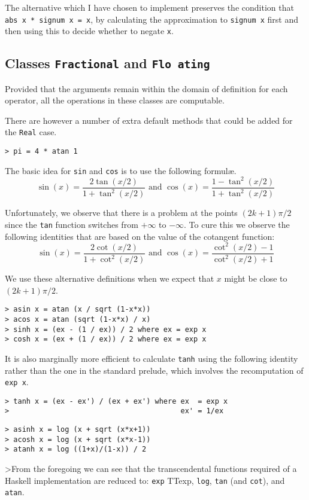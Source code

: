 The alternative which I have chosen to implement preserves the
condition that \mbox{\tt abs\ x\ *\ signum\ x\ =\ x}, by calculating the
approximation to \mbox{\tt signum\ x} first and then using this to decide
whether to negate \mbox{\tt x}.

\subsection{Classes \mbox{\tt Fractional} and \mbox{\tt Flo
ating}}

Provided that the arguments remain within the domain of definition for
each operator, all the operations in these classes are computable.

There are however a number of extra default methods that could be
added for the \mbox{\tt Real} case.
\begin{verbatim}
> pi = 4 * atan 1
\end{verbatim}
The basic idea for \mbox{\tt sin} and \mbox{\tt cos} 
is to use the following formul\ae .
\[\sin(x) = \frac{2 \tan(x/2)}{1+\tan^2(x/2)} \mbox{ and }
  \cos(x) = \frac{1-\tan^2(x/2)}{1+\tan^2(x/2)}\]

Unfortunately, we observe that there is a problem at the points
$(2k+1)\pi / 2$ since the \mbox{\tt tan} function switches from $+
\infty$ to
$-\infty$. To cure this we observe the following identities that are
based on the value of the cotangent function:
\[\sin(x) = \frac{2 \cot(x/2)}{1+\cot^2(x/2)} \mbox{ and }
  \cos(x) = \frac{\cot^2(x/2)-1}{\cot^2(x/2)+1}\]

We use these alternative definitions when we expect that $x$ might be
close to $(2k+1)\pi /2$.
\begin{verbatim}
> asin x = atan (x / sqrt (1-x*x))
> acos x = atan (sqrt (1-x*x) / x)
> sinh x = (ex - (1 / ex)) / 2 where ex = exp x
> cosh x = (ex + (1 / ex)) / 2 where ex = exp x
\end{verbatim}
%
%
%
%
It is also marginally more efficient to calculate \mbox{\tt tanh}
 using the
following identity rather than the one in the standard prelude, which
involves the recomputation of \mbox{\tt exp\ x}.
\begin{verbatim}
> tanh x = (ex - ex') / (ex + ex') where ex  = exp x
>                                        ex' = 1/ex
\end{verbatim}
%
\begin{verbatim}
> asinh x = log (x + sqrt (x*x+1))
> acosh x = log (x + sqrt (x*x-1))
> atanh x = log ((1+x)/(1-x)) / 2
\end{verbatim}
%
%
%
>From the foregoing we can see that the transcendental functions
required of a {\sc Haskell} implementation are reduced to: \mbox{\tt exp}\index
TT{exp},
\mbox{\tt log}, \mbox{\tt tan} (and \mbox{\tt cot}), and \mbox{\tt atan}.

